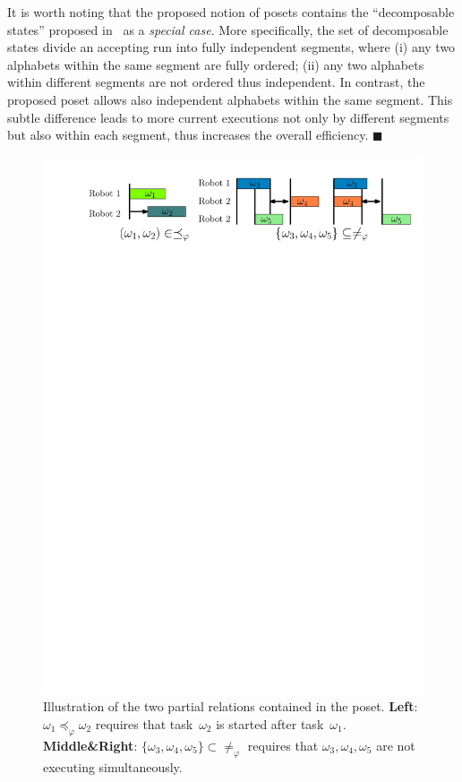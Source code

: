 \begin{remark}\label{remark:compare-poset}
It is worth noting that the proposed notion of posets contains
the ``decomposable states'' proposed in~\citep{schillinger2018simultaneous}
as a \emph{special case}.
More specifically, the set of decomposable states divide an accepting run into
fully independent segments, where
(i) any two alphabets within the same segment are fully ordered;
(ii) any two alphabets within different segments are not ordered thus independent.
In contrast, the proposed poset allows also independent alphabets within the
same segment.
This subtle difference leads to more current executions not only by
different segments but also within each segment,
thus increases the overall efficiency. \hfill $\blacksquare$
\end{remark}
\begin{figure}[t!]
\includegraphics[width=0.95\linewidth]{figures/poset_graph2.pdf}
\centering
\caption{Illustration of the two partial relations
        contained in the poset.
        \textbf{Left}: $\omega_1\preceq_{\varphi} \omega_2$ requires that
task~$\omega_2$ is started after task~$\omega_1$.
\textbf{Middle\&Right}:
$\{\omega_3,\omega_4,\omega_5\}\subset\neq_{\varphi}$
requires that $\omega_3,\omega_4,\omega_5$ are not executing simultaneously.}
\label{fig:partial}
\end{figure}

